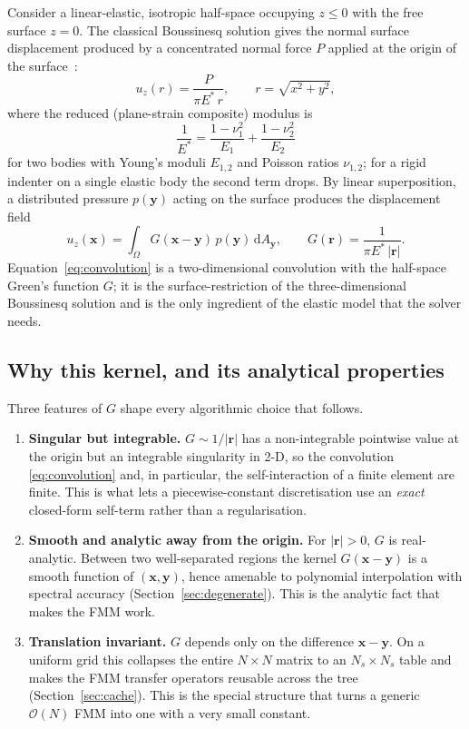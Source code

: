 \documentclass[11pt,a4paper]{article}
\newcommand{\Es}{E^{*}}
\newcommand{\Order}{\mathcal{O}}
\newcommand{\abs}[1]{\left\lvert #1 \right\rvert}
\newcommand{\xx}{\mathbf{x}}
\newcommand{\yy}{\mathbf{y}}
\theoremstyle{definition}
\theoremstyle{remark}
\begin{document}
Consider a linear-elastic, isotropic half-space occupying $z\le 0$ with the free
surface $z=0$. The classical Boussinesq solution gives the normal surface
displacement produced by a concentrated normal force $P$ applied at the origin of
the surface~\cite{Johnson1985}:
\begin{equation}
  u_z(r) = \frac{P}{\pi \Es\, r}, \qquad r=\sqrt{x^2+y^2},
  \label{eq:boussinesq-point}
\end{equation}
where the reduced (plane-strain composite) modulus is
\begin{equation}
  \frac{1}{\Es} = \frac{1-\nu_1^2}{E_1} + \frac{1-\nu_2^2}{E_2}
  \label{eq:estar}
\end{equation}
for two bodies with Young's moduli $E_{1,2}$ and Poisson ratios $\nu_{1,2}$; for a
rigid indenter on a single elastic body the second term drops. By linear
superposition, a distributed pressure $p(\yy)$ acting on the surface produces the
displacement field
\begin{equation}
  u_z(\xx) = \int_{\Omega} G(\xx-\yy)\, p(\yy)\, \mathrm{d}A_{\yy},
  \qquad
  G(\mathbf{r}) = \frac{1}{\pi \Es\, \abs{\mathbf{r}}}.
  \label{eq:convolution}
\end{equation}
Equation~\eqref{eq:convolution} is a two-dimensional convolution with the
half-space Green's function $G$; it is the surface-restriction of the
three-dimensional Boussinesq solution and is the only ingredient of the elastic
model that the solver needs.

\subsection{Why this kernel, and its analytical properties}

Three features of $G$ shape every algorithmic choice that follows.

\begin{enumerate}
\item \textbf{Singular but integrable.} $G\sim 1/\abs{\mathbf r}$ has a
non-integrable pointwise value at the origin but an integrable singularity in
2-D, so the convolution \eqref{eq:convolution} and, in particular, the
self-interaction of a finite element are finite. This is what lets a
piecewise-constant discretisation use an \emph{exact} closed-form self-term
rather than a regularisation.
\item \textbf{Smooth and analytic away from the origin.} For
$\abs{\mathbf r}>0$, $G$ is real-analytic. Between two well-separated regions the
kernel $G(\xx-\yy)$ is a smooth function of $(\xx,\yy)$, hence amenable to
polynomial interpolation with spectral accuracy
(Section~\ref{sec:degenerate}). This is the analytic fact that makes the FMM
work.
\item \textbf{Translation invariant.} $G$ depends only on the difference
$\xx-\yy$. On a uniform grid this collapses the entire $N\times N$ matrix to an
$N_s\times N_s$ table and makes the FMM transfer operators reusable across the
tree (Section~\ref{sec:cache}). This is the special structure that turns a
generic $\Order(N)$ FMM into one with a very small constant.
\end{enumerate}
\end{document}
